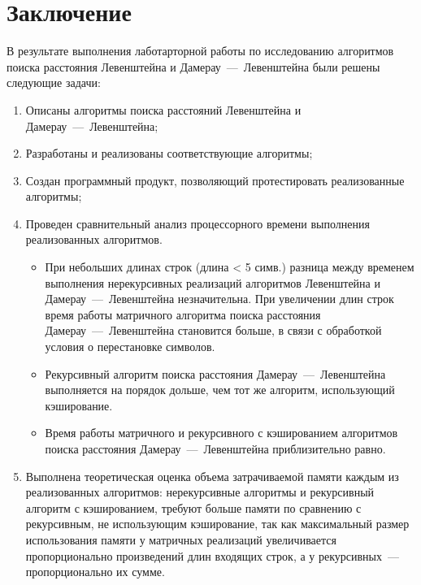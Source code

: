\chapter*{Заключение}

В результате выполнения лаботарторной работы по исследованию алгоритмов поиска расстояния Левенштейна и Дамерау~---~Левенштейна были решены следующие задачи:
\begin{enumerate}
    \item Описаны алгоритмы поиска расстояний Левенштейна и Дамерау~---~Левенштейна;
    \item Разработаны и реализованы соответствующие алгоритмы;
    \item Создан программный продукт, позволяющий протестировать реализованные алгоритмы;
    \item Проведен сравнительный анализ процессорного времени выполнения реализованных алгоритмов.
    \begin{itemize}
        \item При небольших длинах строк (длина < 5 симв.) разница между временем выполнения нерекурсивных реализаций алгоритмов Левенштейна и Дамерау~---~Левенштейна незначительна.
        При увеличении длин строк время работы матричного алгоритма поиска расстояния Дамерау~---~Левенштейна становится больше, в связи с обработкой условия о перестановке символов.
        \item Рекурсивный алгоритм поиска расстояния Дамерау~---~Левенштейна выполняется на порядок дольше, чем тот же алгоритм, использующий кэширование.
        \item Время работы матричного и рекурсивного с кэшированием алгоритмов поиска расстояния Дамерау~---~Левенштейна приблизительно равно.
    \end{itemize}
\item Выполнена теоретическая оценка объема затрачиваемой памяти каждым из реализованных алгоритмов: нерекурсивные алгоритмы и рекурсивный алгоритм с кэшированием, требуют больше памяти по сравнению с рекурсивным, не использующим кэширование, так как максимальный размер использования памяти у матричных реализаций увеличивается пропорционально произведений длин входящих строк, а у рекурсивных~--- пропорционально их сумме.
\end{enumerate}
